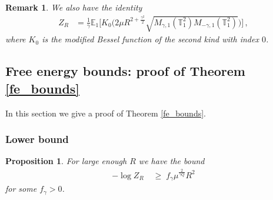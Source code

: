\documentclass[11pt]{article}
\numberwithin{equation}{section}
\newtheorem{proposition}[theorem]{Proposition}
\newtheorem{remark}[theorem]{Remark}
\theoremstyle{definition}
\renewcommand{\geq}{\;\geqslant\;}                   %
\newcommand{\E}{\mathbb{E}}
\def\T{\mathbb{T}}
\newcommand{\tor}{{\T_1^2}}
\begin{document}
\begin{remark}
We also have the identity
\begin{align}\label{eq_bessel}
Z_R &= \tfrac 1 \gamma \E_1 \Big[ K_0 \big( 2\mu  R^{2 + \frac{\gamma^2}{2}} \sqrt{M_{\gamma,1}(\tor) M_{-\gamma,1}(\tor)} \big) \Big]\,,
\end{align}
where $K_0$ is the modified Bessel function of the second kind with index $0$.
\end{remark}

\subsection{Free energy bounds: proof of Theorem \ref{fe_bounds}}

In this section we give a proof of Theorem \ref{fe_bounds}.

\subsubsection{Lower bound}

\begin{proposition}\label{prop_Z_ub}
 For large enough $R$ we have the bound
\begin{align}\label{log_Z_lb}
- \log Z_R & \geq f_\gamma \mu^{\frac{2}{\gamma Q}} R^2
\end{align}
for some $f_\gamma > 0$.
\end{proposition}
\end{document}
